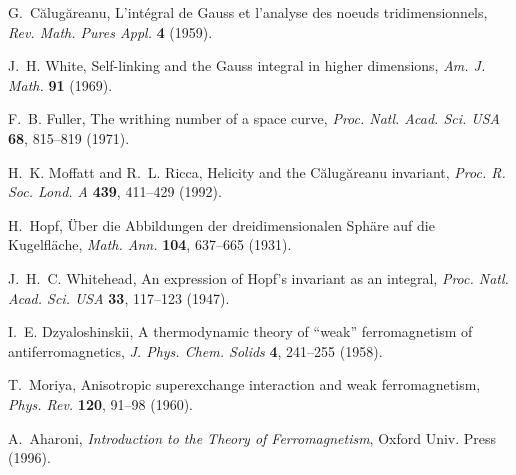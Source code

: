 \documentclass[11pt, a4paper]{article}
\begin{document}
\begin{thebibliography}{99}

    G.~C\u{a}lug\u{a}reanu,
    \newblock L'int\'egral de Gauss et l'analyse des noeuds tridimensionnels,
    \newblock \emph{Rev. Math. Pures Appl.} \textbf{4} (1959).

    J.~H. White,
    \newblock Self-linking and the {G}auss integral in higher dimensions,
    \newblock \emph{Am. J. Math.} \textbf{91} (1969).

    F.~B. Fuller,
    \newblock The writhing number of a space curve,
    \newblock \emph{Proc. Natl. Acad. Sci. USA} \textbf{68}, 815--819 (1971).

    H.~K. Moffatt and R.~L. Ricca,
    \newblock Helicity and the C\u{a}lug\u{a}reanu invariant,
    \newblock \emph{Proc. R. Soc. Lond. A} \textbf{439}, 411--429 (1992).

    H.~Hopf,
    \newblock \"Uber die {A}bbildungen der dreidimensionalen {S}ph\"are auf die {K}ugelfl\"ache,
    \newblock \emph{Math. Ann.} \textbf{104}, 637--665 (1931).

    J.~H.~C. Whitehead,
    \newblock An expression of {H}opf's invariant as an integral,
    \newblock \emph{Proc. Natl. Acad. Sci. USA} \textbf{33}, 117--123 (1947).

    I.~E. Dzyaloshinskii,
    \newblock A thermodynamic theory of ``weak'' ferromagnetism of antiferromagnetics,
    \newblock \emph{J. Phys. Chem. Solids} \textbf{4}, 241--255 (1958).

    T.~Moriya,
    \newblock Anisotropic superexchange interaction and weak ferromagnetism,
    \newblock \emph{Phys. Rev.} \textbf{120}, 91--98 (1960).

    A.~Aharoni,
    \newblock \emph{Introduction to the Theory of Ferromagnetism},
    \newblock Oxford Univ. Press (1996).

\end{thebibliography}


    
\end{document}
